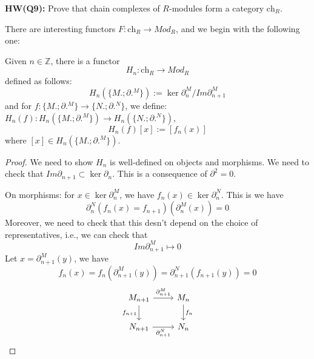 \begin{prob}
    \textbf{HW(Q9):} Prove that chain complexes of $R$-modules form a category $\text{ch}_R$.
\end{prob}
There are interesting functors $F:\text{ch}_R\to Mod_R$, and we begin with the following one:
\begin{defn}[$H_n$, $n$th-homology]
    Given $n\in\mathbb{Z}$, there is a functor 
    \begin{equation*}
        H_n: \text{ch}_R\to Mod_R
    \end{equation*}
    defined as follows:
    \begin{equation*}
        H_n(\{M.;\partial.^M\}):=\ker\partial_n^M\big/ Im \partial_{n+1}^M
    \end{equation*}
    and for $f:\{M.;\partial.^M\}\to\{N.;\partial.^N\}$, we define: $H_n(f): H_n(\{M.;\partial.^M\})\to H_n(\{N.;\partial.^N\})$,
    \begin{equation*}
        H_n(f)[x]:=[f_n(x)]
    \end{equation*}
    where $[x]\in H_n(\{M.;\partial.^M\})$.
\end{defn}
\begin{proof}
    We need to show $H_n$ is well-defined on objects and morphisms. We need to check that $Im\partial_{n+1}\subset\ker\partial_n$. This is a consequence of $\partial^2=0$.

    On morphisms: for $x\in\ker\partial_n^M$, we have $f_n(x)\in\ker\partial_n^N$. This is we have 
    \begin{equation*}
        \partial_n^N(f_n(x)=f_{n+1})(\partial_n^M(x))=0
    \end{equation*}
    Moreover, we need to check that this desn't depend on the choice of representatives, i.e., we can check that 
    \begin{equation*}
        Im\partial_{n+1}^M\mapsto 0
    \end{equation*}
    Let $x=\partial_{n+1}^M(y)$, we have 
    \begin{equation*}
        f_n(x)=f_n(\partial_{n+1}^M(y))=\partial_{n+1}^N(f_{n+1}(y))=0
    \end{equation*}
    \[\begin{tikzcd}
        {M_{n+1}} & {M_n} \\
        {N_{n+1}} & {N_n}
        \arrow["{\partial_{n+1}^M}", from=1-1, to=1-2]
        \arrow["{f_{n+1}}"', from=1-1, to=2-1]
        \arrow["{f_n}", from=1-2, to=2-2]
        \arrow["{\partial_{n+1}^N}"', from=2-1, to=2-2]
    \end{tikzcd}\]
\end{proof}

